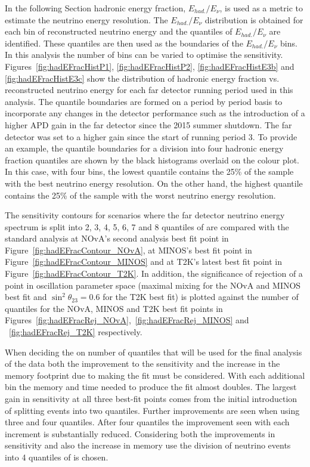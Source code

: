 In the following Section hadronic energy fraction, $E_{had.} /
E_{\nu}$, is used as a metric to estimate the neutrino energy
resolution. 
The $E_{had.} / E_{\nu}$ distribution is obtained for each bin of
reconstructed neutrino energy and the quantiles of $E_{had.}/E_{\nu}$
are identified.  
These quantiles are then used as the boundaries of the $E_{had.} /
E_\nu$ bins. 
In this analysis the number of \hadefrac{} bins can be varied to
optimise the sensitivity.  
Figures~\ref{fig:hadEFracHistP1}, \ref{fig:hadEFracHistP2},
\ref{fig:hadEFracHistE3b} 
and \ref{fig:hadEFracHistE3c} show the distribution of
hadronic energy fraction vs. reconstructed neutrino energy for each
far detector running period used in this analysis. 
The quantile boundaries are formed on a period by period basis to
incorporate any changes in the detector performance such as the
introduction of a higher APD gain in the far detector since the 2015
summer shutdown. The far detector was set to a higher gain since the
start of running period 3.
To provide an example, the quantile
boundaries for a division into four hadronic energy fraction quantiles
are shown by the black histograms overlaid on the colour plot. 
In this case, with four \hadefrac{} bins, the lowest \hadefrac{}
quantile contains the
25\% of the sample with the best neutrino energy resolution. On the
other hand, the highest quantile contains the 25\% of the sample with
the worst neutrino energy resolution.


The sensitivity contours for scenarios where the far detector neutrino
energy spectrum is split into 2, 3, 4, 5, 6, 7 and 8 quantiles of
\hadefrac{} are compared with the standard analysis
at NOvA's second analysis best fit point in
Figure~\ref{fig:hadEFracContour_NOvA}, at MINOS's best fit point in
Figure~\ref{fig:hadEFracContour_MINOS} and at T2K's latest best fit
point in Figure~\ref{fig:hadEFracContour_T2K}. In addition, the
significance of rejection of a point in oscillation parameter space
(maximal mixing for the NOvA and MINOS best fit and $\sin^2\theta_{23}
= 0.6$ for the T2K best fit) is plotted against 
the number of \hadefrac{} quantiles for the NOvA, MINOS and T2K best fit
points in
Figures~\ref{fig:hadEFracRej_NOvA},~\ref{fig:hadEFracRej_MINOS} and
~\ref{fig:hadEFracRej_T2K} respectively.

When deciding the on number of \hadefrac{} quantiles that will be used
for the final analysis of the data both the improvement to
the sensitivity and the increase in the memory footprint due to making
the fit must be considered. With each additional \hadefrac{} bin the
memory and time needed to produce the fit almost doubles. 
The largest gain in sensitivity at all three best-fit points comes
from the initial introduction of splitting events into two \hadefrac{}
quantiles. Further improvements are seen when using three and four
quantiles. After four quantiles the improvement seen with each
increment is substantially reduced. Considering both the improvements
in sensitivity and also the increase in memory use the division of
neutrino events into 4 quantiles of \hadefrac{} is chosen. 


